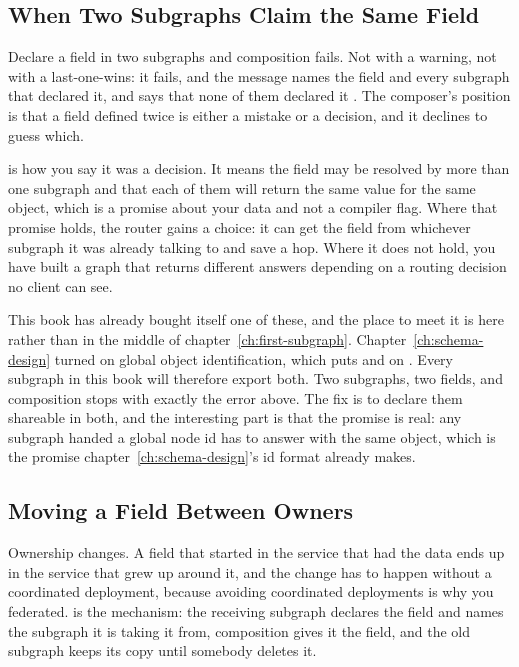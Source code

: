 \subsection{When Two Subgraphs Claim the Same Field}

%
Declare a field in two subgraphs and composition fails. Not with a warning, not
with a last-one-wins: it fails, and the message names the field and every
subgraph that declared it, and says that none of them declared it
. The composer's position is that a field defined twice is
either a mistake or a decision, and it declines to guess which.

%
 is how you say it was a decision. It means the field may be
resolved by more than one subgraph and that each of them will return the same
value for the same object, which is a promise about your data and not a
compiler flag. Where that promise holds, the router gains a choice: it can get
the field from whichever subgraph it was already talking to and save a hop.
Where it does not hold, you have built a graph that returns different answers
depending on a routing decision no client can see.

%
This book has already bought itself one of these, and the place to meet it is
here rather than in the middle of chapter~\ref{ch:first-subgraph}.
Chapter~\ref{ch:schema-design} turned on global object identification, which
puts  and  on . Every subgraph in this book
will therefore export both. Two subgraphs, two  fields, and
composition stops with exactly the error above. The fix is to declare them
shareable in both, and the interesting part is that the promise is real: any
subgraph handed a global node id has to answer with the same object, which is
the promise chapter~\ref{ch:schema-design}'s id format already makes.

\subsection{Moving a Field Between Owners}

%
Ownership changes. A field that started in the service that had the data ends
up in the service that grew up around it, and the change has to happen without
a coordinated deployment, because avoiding coordinated deployments is why you
federated.  is the mechanism: the receiving subgraph
declares the field and names the subgraph it is taking it from, composition
gives it the field, and the old subgraph keeps its copy until somebody deletes
it.

